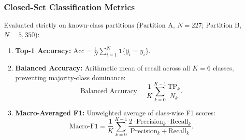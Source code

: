 \subsubsection{Closed-Set Classification Metrics}
Evaluated strictly on known-class partitions (Partition A, $N = 227$; Partition B, $N = 5,350$):
\begin{enumerate}
\item \textbf{Top-1 Accuracy:} $\text{Acc} = \frac{1}{N} \sum_{i=1}^N \mathbf{1}\{\hat{y}_i = y_i\}$.
\item \textbf{Balanced Accuracy:} Arithmetic mean of recall across all $K = 6$ classes, preventing majority-class dominance:
\begin{equation}
\text{Balanced Accuracy} = \frac{1}{K} \sum_{k=0}^{K-1} \frac{\text{TP}_k}{N_k}.
\end{equation}
\item \textbf{Macro-Averaged F1:} Unweighted average of class-wise F1 scores:
\begin{equation}
\text{Macro-F1} = \frac{1}{K} \sum_{k=0}^{K-1} \frac{2 \cdot \text{Precision}_k \cdot \text{Recall}_k}{\text{Precision}_k + \text{Recall}_k}.
\end{equation}
\end{enumerate}

